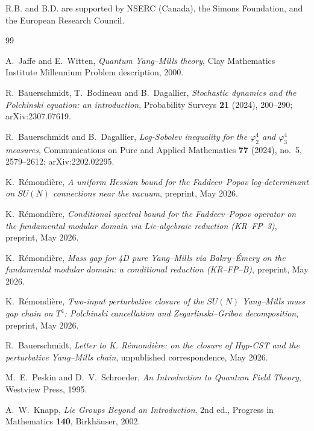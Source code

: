 \documentclass[11pt,a4paper]{amsart}
\theoremstyle{definition}
\begin{document}
R.B. and B.D. are supported by NSERC (Canada), the Simons Foundation,
and the European Research Council.

\begin{thebibliography}{99}

A.~Jaffe and E.~Witten,
\emph{Quantum Yang--Mills theory},
Clay Mathematics Institute Millennium Problem description, 2000.

R.~Bauerschmidt, T.~Bodineau and B.~Dagallier,
\emph{Stochastic dynamics and the Polchinski equation: an introduction},
Probability Surveys \textbf{21} (2024), 200--290; arXiv:2307.07619.

R.~Bauerschmidt and B.~Dagallier,
\emph{Log-Sobolev inequality for the $\varphi^4_2$ and $\varphi^4_3$ measures},
Communications on Pure and Applied Mathematics \textbf{77} (2024), no.~5, 2579--2612;
arXiv:2202.02295.

K.~R\'emondi\`ere,
\emph{A uniform Hessian bound for the Faddeev--Popov log-determinant on
$SU(N)$ connections near the vacuum},
preprint, May 2026.

K.~R\'emondi\`ere,
\emph{Conditional spectral bound for the Faddeev--Popov operator on the
fundamental modular domain via Lie-algebraic reduction (KR--FP--3)},
preprint, May 2026.

K.~R\'emondi\`ere,
\emph{Mass gap for 4D pure Yang--Mills via Bakry--\'Emery on the fundamental
modular domain: a conditional reduction (KR--FP--B)},
preprint, May 2026.

K.~R\'emondi\`ere,
\emph{Two-input perturbative closure of the $SU(N)$ Yang--Mills mass gap
chain on $T^4$: Polchinski cancellation and Zegarlinski--Gribov
decomposition},
preprint, May 2026.

R.~Bauerschmidt,
\emph{Letter to K. R\'emondi\`ere: on the closure of Hyp-CST and the
perturbative Yang--Mills chain},
unpublished correspondence, May 2026.

M.~E.~Peskin and D.~V.~Schroeder,
\emph{An Introduction to Quantum Field Theory},
Westview Press, 1995.

A.~W.~Knapp,
\emph{Lie Groups Beyond an Introduction},
2nd ed., Progress in Mathematics \textbf{140}, Birkh\"auser, 2002.


\end{thebibliography}
\end{document}
